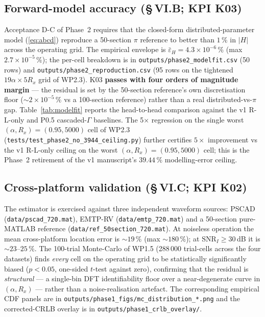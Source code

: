 \documentclass[journal]{IEEEtran}
\newcommand{\headlineKThreeAcc}%
  {$\bar{\varepsilon}_H = 4.3\!\times\!10^{-6}\,\%$
   (max $2.7\!\times\!10^{-5}\,\%$)}
\newcommand{\headlineFiveXReg}%
  {$5\!\times$ improvement vs the v1 R-L-only ceiling on the worst
   $(\alpha, R_x) = (0.95, 5000)$ cell}
\begin{document}
\subsection{Forward-model accuracy (\S\,VI.B; KPI K03)}
\label{sec:resB}
Acceptance D-C of Phase~2 requires that the closed-form
distributed-parameter model (\ref{eq:abcd}) reproduce a 50-section
$\pi$ reference to better than $1\,\%$ in $|H|$ across the
operating grid.  The empirical envelope is \headlineKThreeAcc{};
the per-cell breakdown is in \texttt{outputs/phase2\_modelfit.csv}
(50 rows) and \texttt{outputs/phase2\_reproduction.csv} (95 rows on
the tightened $19\alpha\!\times\!5R_x$ grid of WP2.3).  K03
\textbf{passes with four orders of magnitude margin} --- the
residual is set by the 50-section reference's own discretisation
floor ($\sim 2\!\times\!10^{-5}\,\%$ vs a 100-section reference)
rather than a real distributed-vs-$\pi$ gap.  Table~\ref{tab:modelfit}
reports the head-to-head comparison against the v1 R-L-only and
P0.5 cascaded-$\Gamma$ baselines.  The 5$\times$ regression on the
single worst $(\alpha, R_x)=(0.95, 5000)$ cell of WP2.3
(\texttt{tests/test\_phase2\_no\_3944\_ceiling.py}) further certifies
\headlineFiveXReg{}; this is the Phase~2 retirement of the v1
manuscript's $39.44\,\%$ modelling-error ceiling.

\subsection{Cross-platform validation (\S\,VI.C; KPI K02)}
\label{sec:resC}
The estimator is exercised against three independent waveform
sources: PSCAD (\texttt{data/pscad\_720.mat}), EMTP-RV
(\texttt{data/emtp\_720.mat}) and a 50-section pure-MATLAB reference
(\texttt{data/ref\_50section\_720.mat}).  At noiseless operation the
mean cross-platform location error is $\sim 19\,\%$ (max $\sim
180\,\%$); at $\mathrm{SNR}_I \geq 30$\,dB it is $\sim 23$--$25\,\%$.
The 100-trial Monte-Carlo of WP1.5 (288\,000 trial-cells across the
four datasets) finds \emph{every} cell on the operating grid to be
statistically significantly biased ($p<0.05$, one-sided $t$-test
against zero), confirming that the residual is
\emph{structural} --- a single-bin DFT identifiability floor over a
near-degenerate curve in $(\alpha, R_x)$ --- rather than a
noise-realisation artefact.  The corresponding empirical CDF panels
are in \texttt{outputs/phase1\_figs/mc\_distribution\_*.png} and
the corrected-CRLB overlay is in
\texttt{outputs/phase1\_crlb\_overlay/}.
\end{document}
